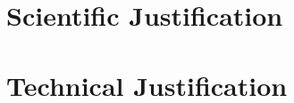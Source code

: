 \documentclass[11pt,a4paper,twoside]{article}
\begin{document}
    \pagestyle{fancy}
    \fancyhead{}

    \section*{Scientific Justification}



    \section*{Technical Justification}



    
    
\end{document}
